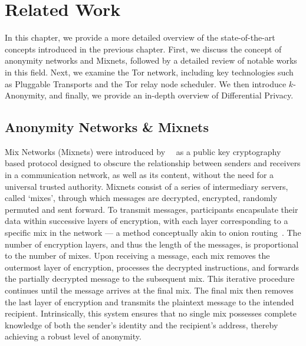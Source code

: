 
%

\chapter{Related Work}\label{cha:related_work}

In this chapter, we provide a more detailed overview of the state-of-the-art concepts introduced in the previous chapter. First, we discuss the concept of anonymity networks and Mixnets, followed by a detailed review of notable works in this field. Next, we examine the Tor network, including key technologies such as Pluggable Transports and the Tor relay node scheduler. We then introduce \(k\)-Anonymity, and finally, we provide an in-depth overview of Differential Privacy.

\section{Anonymity Networks \& Mixnets}\label{sec:anonymity_networks_mixnets}

Mix Networks (Mixnets) were introduced by~\citeauthor{Chaum2003}~\cite{Chaum2003} as a public key cryptography based protocol designed to obscure the relationship between senders and receivers in a communication network, as well as its content, without the need for a universal trusted authority. Mixnets consist of a series of intermediary servers, called `mixes', through which messages are decrypted, encrypted, randomly permuted and sent forward.
To transmit messages, participants encapsulate their data within successive layers of encryption, with each layer corresponding to a specific mix in the network — a method conceptually akin to onion routing~\cite{OnionRouting}. The number of encryption layers, and thus the length of the messages, is proportional to the number of mixes. Upon receiving a message, each mix removes the outermost layer of encryption, processes the decrypted instructions, and forwards the partially decrypted message to the subsequent mix. This iterative procedure continues until the message arrives at the final mix. The final mix then removes the last layer of encryption and transmits the plaintext message to the intended recipient. Intrinsically, this system ensures that no single mix possesses complete knowledge of both the sender's identity and the recipient's address, thereby achieving a robust level of anonymity.

